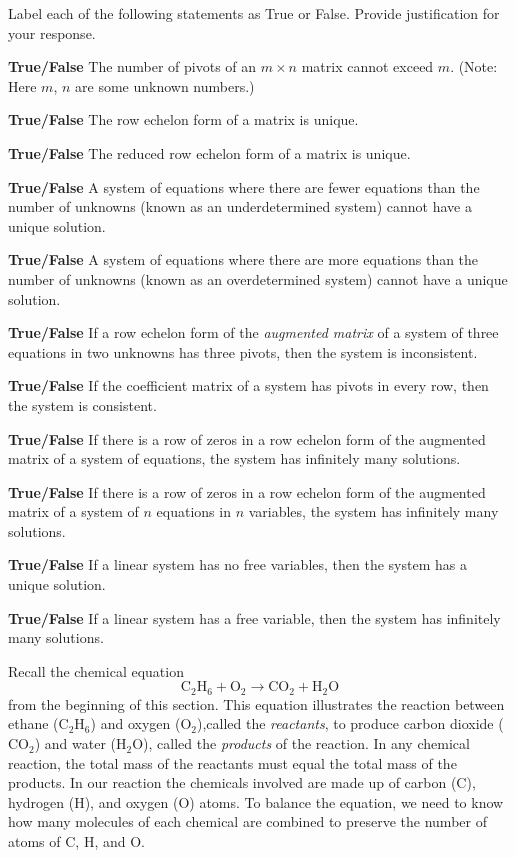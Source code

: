\item Label each of the following statements as True or False. Provide justification for your response.
	\ba
	\item \textbf{True/False} The number of pivots of an $m \times n$ matrix cannot exceed $m$. (Note: Here $m$, $n$ are some unknown numbers.)
	\item \textbf{True/False} The row echelon form of a matrix is unique.
	\item \textbf{True/False} The reduced row echelon form of a matrix is unique.
	\item \textbf{True/False} A system of equations where there are fewer equations than the number of unknowns (known as an underdetermined system) cannot have a unique solution.
	\item \textbf{True/False} A system of equations where there are more equations than the number of unknowns (known as an overdetermined system) cannot have a unique solution.
	\item  \textbf{True/False} If a row echelon form of the {\em augmented matrix} of a system of three equations in two unknowns has three pivots, then the system is inconsistent.
	\item \textbf{True/False} If the coefficient matrix of a system has pivots in every row, then the system is consistent.
	\item \textbf{True/False} If there is a row of zeros in a row echelon form of the augmented matrix of a system of equations, the
system has infinitely many solutions.
	\item \textbf{True/False} If there is a row of zeros in a row echelon form of the augmented matrix of a system of $n$ equations in $n$ variables, the system has infinitely many solutions.
	\item \textbf{True/False} If a linear system has no free variables, then the system has a unique solution.
	\item  \textbf{True/False} If a linear system has a free variable, then the system has infinitely many solutions.
	\ea
\ee


\label{sec:prof_chem_react}

Recall the chemical equation
\begin{equation*}
\text{C}_2\text{H}_6 + \text{O}_2 \to \text{CO}_2 + \text{H}_2\text{O} %
\end{equation*}
from the beginning of this section. This equation illustrates the reaction between ethane ($\text{C}_2\text{H}_6$) and oxygen ($\text{O}_2$),called the \emph{reactants}, to produce carbon dioxide ($\text{CO}_2$) and water ($\text{H}_2\text{O}$), called the \emph{products} of the reaction.  In any chemical reaction, the total mass of the reactants must equal the total mass of the products. In our reaction the chemicals involved are made up of carbon (C), hydrogen (H), and oxygen (O) atoms. To balance the equation, we need to know how many molecules of each chemical are combined to preserve the number of atoms of C, H, and O.


